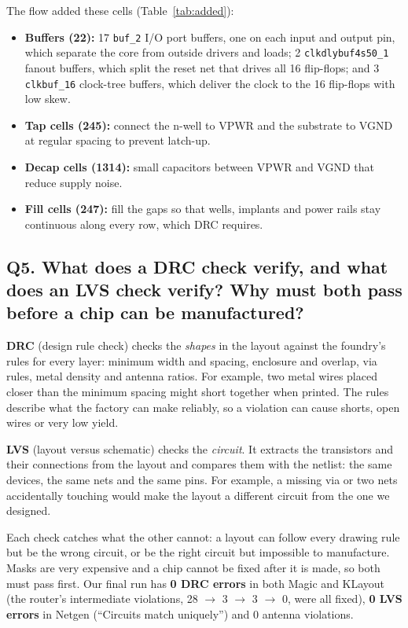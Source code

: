 \documentclass[10pt,a4paper,twocolumn]{article}
\newcommand{\cell}[1]{\texttt{#1}}
\begin{document}
The flow added these cells (Table~\ref{tab:added}):
\begin{itemize}[nosep]
  \item \textbf{Buffers (22):} 17 \cell{buf\_2} I/O port buffers, one on each input and output pin, which
        separate the core from outside drivers and loads; 2 \cell{clkdlybuf4s50\_1} fanout buffers, which split the
        reset net that drives all 16 flip-flops; and 3 \cell{clkbuf\_16} clock-tree buffers, which deliver the
        clock to the 16 flip-flops with low skew.
  \item \textbf{Tap cells (245):} connect the n-well to VPWR and the substrate to VGND at regular spacing to
        prevent latch-up.
  \item \textbf{Decap cells (1314):} small capacitors between VPWR and VGND that reduce supply noise.
  \item \textbf{Fill cells (247):} fill the gaps so that wells, implants and power rails stay continuous along
        every row, which DRC requires.
\end{itemize}

\subsection*{Q5. What does a DRC check verify, and what does an LVS check verify? Why must both pass before a chip can be manufactured?}

\textbf{DRC} (design rule check) checks the \emph{shapes} in the layout against the foundry's rules for every
layer: minimum width and spacing, enclosure and overlap, via rules, metal density and antenna ratios. For
example, two metal wires placed closer than the minimum spacing might short together when printed. The rules
describe what the factory can make reliably, so a violation can cause shorts, open wires or very low yield.

\textbf{LVS} (layout versus schematic) checks the \emph{circuit}. It extracts the transistors and their
connections from the layout and compares them with the netlist: the same devices, the same nets and the same
pins. For example, a missing via or two nets accidentally touching would make the layout a different circuit
from the one we designed.

Each check catches what the other cannot: a layout can follow every drawing rule but be the wrong circuit, or be
the right circuit but impossible to manufacture. Masks are very expensive and a chip cannot be fixed after it is
made, so both must pass first. Our final run has \textbf{0 DRC errors} in both Magic and KLayout (the router's
intermediate violations, 28 $\rightarrow$ 3 $\rightarrow$ 3 $\rightarrow$ 0, were all fixed), \textbf{0 LVS errors}
in Netgen (``Circuits match uniquely'') and 0 antenna violations.
\end{document}
